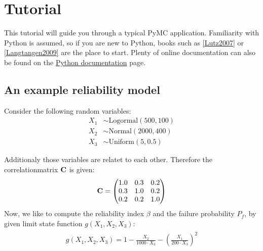 \documentclass[letterpaper,10pt,english]{sphinxmanual}
\begin{document}
\chapter{Tutorial}
\label{tutorial:chap-tutorial}\label{tutorial::doc}\label{tutorial:jurgen-hackl}\label{tutorial:tutorial}
This tutorial will guide you through a typical PyMC application. Familiarity
with Python is assumed, so if you are new to Python, books such as {\hyperref[references:lutz2007]{{[}Lutz2007{]}}}
or {\hyperref[references:langtangen2009]{{[}Langtangen2009{]}}} are the place to start. Plenty of online documentation
can also be found on the \href{http://www.python.org/doc/}{Python documentation} page.


\section{An example reliability model}
\label{tutorial:an-example-reliability-model}
Consider the following random variables:
\label{tutorial:equation-random_variables}
        \begin{align}
        X_1 &\sim \text{Logormal}(500,100)\\
        X_2 &\sim \text{Normal}(2000,400)\\
        X_3 &\sim \text{Uniform}(5,0.5)
        \end{align}

\label{tutorial-random_variables}

Additionaly those variables are relatet to each other. Therefore the
correlationmatrix ${\bf C}$ is given:
\label{tutorial:equation-correlation_matrix}\begin{gather}
\begin{split}        \begin{align}
        {\bf C} =
        \begin{pmatrix}
        1.0 & 0.3 & 0.2\\
        0.3 & 1.0 & 0.2\\
        0.2 & 0.2 & 1.0
        \end{pmatrix}
        \end{align}\end{split}\label{tutorial-correlation_matrix}
\end{gather}
Now, we like to compute the reliability index $\beta$ and the failure
probability $P_f$, by given limit state function $g(X_1,X_2,X_3)$:
\label{tutorial:equation-limit_state_function}\begin{gather}
\begin{split}        g(X_1,X_2,X_3) = 1 - \frac{X_2}{1000 \cdot X_3} -
        \left( \frac{X_1}{200 \cdot X_3} \right)^2\end{split}\label{tutorial-limit_state_function}
\end{gather}
\end{document}
